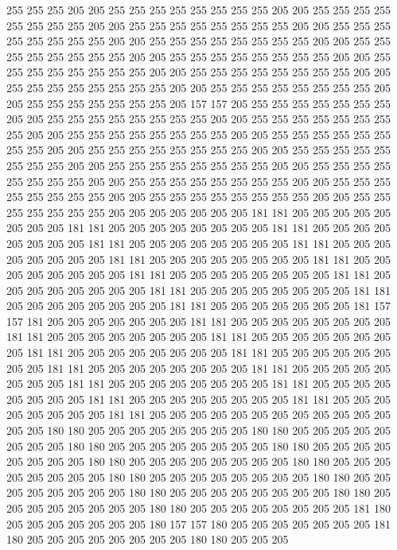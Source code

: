 255 255 255 205 205 255 255 255 255 255 255 255 255 205 205 255 255 255 255 255
255 255 255 205 205 255 255 255 255 255 255 255 255 205 205 255 255 255 255 255
255 255 255 205 205 255 255 255 255 255 255 255 255 205 205 255 255 255 255 255
255 255 255 205 205 255 255 255 255 255 255 255 255 205 205 255 255 255 255 255
255 255 255 205 205 255 255 255 255 255 255 255 255 205 205 255 255 255 255 255
255 255 255 205 205 255 255 255 255 255 255 255 255 205 205 255 255 255 255 255
255 255 205 157 157 205 255 255 255 255 255 255 255 205 205 255 255 255 255 255
255 255 255 205 205 255 255 255 255 255 255 255 255 205 205 255 255 255 255 255
255 255 255 205 205 255 255 255 255 255 255 255 255 205 205 255 255 255 255 255
255 255 255 205 205 255 255 255 255 255 255 255 255 205 205 255 255 255 255 255
255 255 255 205 205 255 255 255 255 255 255 255 255 205 205 255 255 255 255 255
255 255 255 205 205 255 255 255 255 255 255 255 255 205 205 255 255 255 255 255
255 255 255 205 205 255 255 255 255 255 255 255 205 205 205 205 205 205 205 181
181 205 205 205 205 205 205 205 205 181 181 205 205 205 205 205 205 205 205 181
181 205 205 205 205 205 205 205 205 181 181 205 205 205 205 205 205 205 205 181
181 205 205 205 205 205 205 205 205 181 181 205 205 205 205 205 205 205 205 181
181 205 205 205 205 205 205 205 205 181 181 205 205 205 205 205 205 205 205 181
181 205 205 205 205 205 205 205 205 181 181 205 205 205 205 205 205 205 205 181
181 205 205 205 205 205 205 205 205 181 181 205 205 205 205 205 205 205 181 157
157 181 205 205 205 205 205 205 205 181 181 205 205 205 205 205 205 205 205 181
181 205 205 205 205 205 205 205 205 181 181 205 205 205 205 205 205 205 205 181
181 205 205 205 205 205 205 205 205 181 181 205 205 205 205 205 205 205 205 181
181 205 205 205 205 205 205 205 205 181 181 205 205 205 205 205 205 205 205 181
181 205 205 205 205 205 205 205 205 181 181 205 205 205 205 205 205 205 205 181
181 205 205 205 205 205 205 205 205 181 181 205 205 205 205 205 205 205 205 181
181 205 205 205 205 205 205 205 205 205 205 205 205 205 205 180 180 205 205 205
205 205 205 205 205 180 180 205 205 205 205 205 205 205 205 180 180 205 205 205
205 205 205 205 205 180 180 205 205 205 205 205 205 205 205 180 180 205 205 205
205 205 205 205 205 180 180 205 205 205 205 205 205 205 205 180 180 205 205 205
205 205 205 205 205 180 180 205 205 205 205 205 205 205 205 180 180 205 205 205
205 205 205 205 205 180 180 205 205 205 205 205 205 205 205 180 180 205 205 205
205 205 205 205 205 181 180 205 205 205 205 205 205 205 180 157 157 180 205 205
205 205 205 205 205 181 180 205 205 205 205 205 205 205 205 180 180 205 205 205
